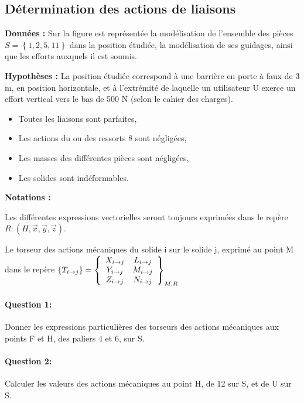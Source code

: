 \subsection{Détermination des actions de liaisons}

\textbf{Données :}
Sur la figure est représentée la modélisation de l'ensemble des pièces $S = \left\{1, 2, 5, 11\right\}$ dans la position étudiée, la modélisation de ses guidages, ainsi que les efforts auxquels il est soumis.

\textbf{Hypothèses :}
La position étudiée correspond à une barrière en porte à faux de 3 m, en position horizontale, et à l'extrémité de laquelle un utilisateur U exerce un effort vertical vers le bas de 500 N (selon le cahier des charges).

\begin{itemize}
 \item Toutes les liaisons sont parfaites,
 \item Les actions du ou des ressorts 8 sont négligées,
 \item Les masses des différentes pièces sont négligées,
 \item Les solides sont indéformables.
\end{itemize}

\newpage

\textbf{Notations :}

Les différentes expressions vectorielles seront toujours exprimées dans le repère $R : \left(H,\overrightarrow{x},\overrightarrow{y},\overrightarrow{z}\right)$.

Le torseur des actions mécaniques du solide i sur le solide j, exprimé au point M dans le repère
$\left\{T_{i \rightarrow j}\right\}=\left\{\begin{array}{c c}
X_{i \rightarrow j} & L_{i \rightarrow j} \\
Y_{i \rightarrow j} & M_{i \rightarrow j} \\
Z_{i \rightarrow j} & N_{i \rightarrow j}
\end{array}\right\}_{M,R}$

\paragraph{Question 1:} Donner les expressions particulières des torseurs des actions mécaniques aux points F et H, des paliers 4 et 6, sur S.

\paragraph{Question 2:} Calculer les valeurs des actions mécaniques au point H, de 12 sur S, et de U sur S.

